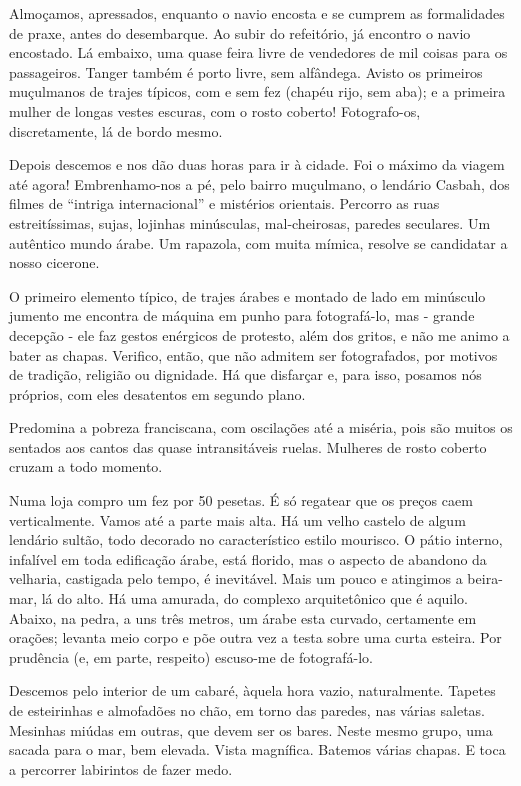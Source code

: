 Almoçamos, apressados, enquanto o navio encosta e se cumprem as formalidades de praxe, antes do desembarque. Ao subir do refeitório, já encontro o navio encostado. Lá embaixo, uma quase feira livre de vendedores de mil coisas para os passageiros. Tanger também é porto livre, sem alfândega. Avisto os primeiros muçulmanos de trajes típicos, com e sem fez (chapéu rijo, sem aba); e a primeira mulher de longas vestes escuras, com o rosto coberto! Fotografo-os, discretamente, lá de bordo mesmo.

Depois descemos e nos dão duas horas para ir à cidade. Foi o máximo da viagem até agora! Embrenhamo-nos a pé, pelo bairro muçulmano, o lendário Casbah, dos filmes de “intriga internacional” e mistérios orientais. Percorro as ruas estreitíssimas, sujas, lojinhas minúsculas, mal-cheirosas, paredes seculares. Um autêntico mundo árabe. Um rapazola, com muita mímica, resolve se candidatar a nosso cicerone.

O primeiro elemento típico, de trajes árabes e montado de lado em minúsculo jumento me encontra de máquina em punho para fotografá-lo, mas - grande decepção - ele faz gestos enérgicos de protesto, além dos gritos, e não me animo a bater as chapas. Verifico, então, que não admitem ser fotografados, por motivos de tradição, religião ou dignidade. Há que disfarçar e, para isso, posamos nós próprios, com eles desatentos em segundo plano.

Predomina a pobreza franciscana, com oscilações até a miséria, pois são muitos os sentados aos cantos das quase intransitáveis ruelas. Mulheres de rosto coberto cruzam a todo momento.

Numa loja compro um fez por 50 pesetas. É só regatear que os preços caem verticalmente. Vamos até a parte mais alta. Há um velho castelo de algum lendário sultão, todo decorado no característico estilo mourisco. O pátio interno, infalível em toda edificação árabe, está florido, mas o aspecto de abandono da velharia, castigada pelo tempo, é inevitável. Mais um pouco e atingimos a beira-mar, lá do alto. Há uma amurada, do complexo arquitetônico que é aquilo. Abaixo, na pedra, a uns três metros, um árabe esta curvado, certamente em orações; levanta meio corpo e põe outra vez a testa sobre uma curta esteira. Por prudência (e, em parte, respeito) escuso-me de fotografá-lo.

Descemos pelo interior de um cabaré, àquela hora vazio, naturalmente. Tapetes de esteirinhas e almofadões no chão, em torno das paredes, nas várias saletas. Mesinhas miúdas em outras, que devem ser os bares. Neste mesmo grupo, uma sacada para o mar, bem elevada. Vista magnífica. Batemos várias chapas. E toca a percorrer labirintos de fazer medo.

